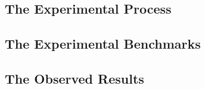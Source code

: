 
\def\rsub#1#2{\subsection{#2} \label{sub:#1} }

\rsub{experiment}{The Experimental Process} 

\rsub{benchmarks}{The Experimental Benchmarks}
\rsub{observed}  {The Observed Results}

